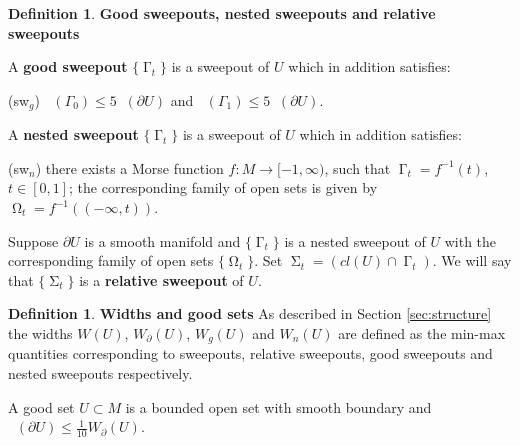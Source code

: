 \documentclass[12pt]{amsart}
\DeclareMathOperator{\Hn}{\mathcal{H}^n}
\DeclareMathOperator{\G}{\Gamma}
\DeclareMathOperator{\Om}{\Omega}
\DeclareMathOperator{\Si}{\Sigma}
\newcommand{\Cgs}{5 \Hn(\partial U)}
\theoremstyle{definition}
\newtheorem{definition}[theorem]{Definition}
\begin{document}
\begin{definition}
\textbf{Good sweepouts, nested sweepouts
and relative sweepouts}




A \textbf{good sweepout} $\{ \G_t \}$
is a sweepout of $U$ which in addition satisfies:

(sw$_g$) $\Hn(\Gamma_0)\leq \Cgs$ and 
$\Hn(\Gamma_1) \leq  \Cgs$.

\vspace{0.2in}

A \textbf{nested sweepout} $\{ \G_t \}$
is a sweepout of $U$ which in addition satisfies:

(sw$_n$) there exists a Morse function 
$f: M \rightarrow [-1, \infty)$,
such that $\G_t = f^{-1}(t)$, $t \in [0,1]$;
the corresponding family of open sets is given by
$\Om_{t} = f^{-1}((-\infty, t))$.

\vspace{0.2in}

Suppose $\partial U$ is a smooth manifold
and  $\{ \G_t \}$ is a nested sweepout of $U$ with 
the corresponding family of open sets $\{\Om_t\}$.
Set $\Si_t = (cl(U) \cap \G_t)$.
We will say that $\{ \Si_t  \}$ is a
\textbf{relative sweepout} of $U$.

\end{definition}

\begin{definition}
\textbf{Widths and good sets}
As described in Section \ref*{sec:structure}
the widths $W(U)$, $W_{\partial}(U)$,
$W_g(U)$ and $W_n(U)$ are defined as the min-max quantities 
corresponding to sweepouts, relative sweepouts, good sweepouts
and nested sweepouts respectively.

A good set $U \subset M$ is a bounded open set with smooth boundary
and $\Hn(\partial U) \leq \frac{1}{10} W_{\partial}(U)$.
\end{definition}

\end{document}

